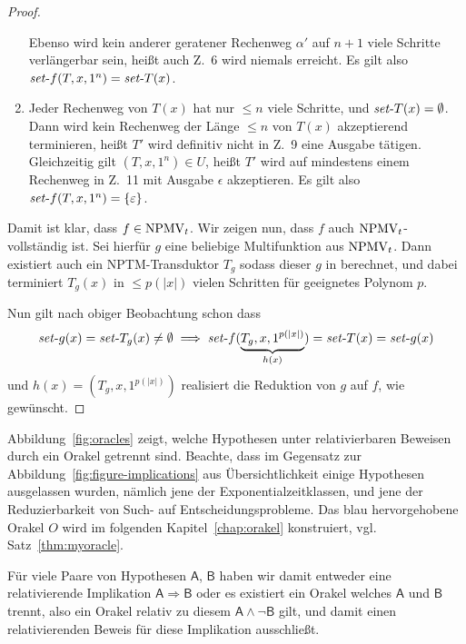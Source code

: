 \begin{proof}
\begin{enumerate}[label=\arabic*.]
            Ebenso wird kein anderer geratener Rechenweg $\alpha'$ auf $n+1$ viele Schritte verlängerbar sein, heißt auch Z.~6 wird niemals erreicht.
            Es gilt also $\mathit{set}\text{-}{f}(T, x, 1^n)=\mathit{set}\text{-}{T}(x)$.
    \item Jeder Rechenweg von $T(x)$ hat nur $\leq n$ viele Schritte, und $\mathit{set}\text{-}{T}(x)=\emptyset$. 
        Dann wird kein Rechenweg der Länge $\leq n$ von $T(x)$ akzeptierend terminieren, heißt $T'$ wird definitiv nicht in Z.~9 eine Ausgabe tätigen.
        Gleichzeitig gilt $(T, x, 1^n)\in U$, heißt $T'$ wird auf mindestens einem Rechenweg in Z.~11 mit Ausgabe $\epsilon$ akzeptieren.
        Es gilt also $\mathit{set}\text{-}{f}(T, x, 1^n)=\{\varepsilon\}$.
    \end{enumerate}

    Damit ist klar, dass $f\in\mathrm{NPMV}_t$.
    Wir zeigen nun, dass $f$ auch $\mathrm{NPMV}_t$-vollständig ist.
    Sei hierfür $g$ eine beliebige Multifunktion aus $\mathrm{NPMV}_t$.
    Dann existiert auch ein NPTM-Transduktor $T_g$ sodass dieser $g$ in berechnet, und dabei terminiert $T_g(x)$ in $\leq p(|x|)$ vielen Schritten für geeignetes Polynom $p$.

    Nun gilt nach obiger Beobachtung schon dass 
    \[ \mathit{set}\text{-}{g}(x) = \mathit{set}\text{-}{T_g}(x)\neq\emptyset \implies \mathit{set}\text{-}{f}(\underbrace{T_g, x, 1^{p(|x|)}}_{h(x)})=\mathit{set}\text{-}{T}(x)=\mathit{set}\text{-}{g}(x) \]
    und $h(x)=(T_g, x, 1^{p(|x|)})$ realisiert die Reduktion von $g$ auf $f$, wie gewünscht.
\end{proof}


Abbildung~\ref{fig:oracles} zeigt, welche Hypothesen unter relativierbaren Beweisen durch ein Orakel getrennt sind.
Beachte, dass im Gegensatz zur Abbildung~\ref{fig:figure-implications} aus Übersichtlichkeit einige Hypothesen ausgelassen wurden, nämlich jene der Exponentialzeitklassen, und jene der Reduzierbarkeit von Such- auf Entscheidungsprobleme.
Das blau hervorgehobene Orakel $O$ wird im folgenden Kapitel~\ref{chap:orakel} konstruiert, vgl. Satz~\ref{thm:myoracle}.

Für viele Paare von Hypothesen $\mathsf{A}$, $\mathsf{B}$ haben wir damit entweder eine relativierende Implikation $\mathsf{A}\Rightarrow\mathsf{B}$ oder es existiert ein Orakel welches $\mathsf{A}$ und $\mathsf{B}$ trennt,  also ein Orakel relativ zu diesem $\mathsf{A}\land \neg\mathsf{B}$ gilt, und damit einen relativierenden Beweis für diese Implikation ausschließt. 

